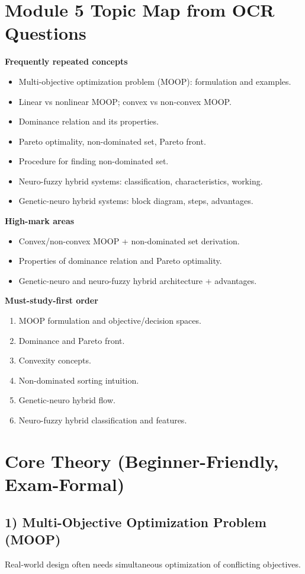 \documentclass[11pt,a4paper]{article}
\begin{document}
\section*{Module 5 Topic Map from OCR Questions}
\textbf{Frequently repeated concepts}
\begin{itemize}
\item Multi-objective optimization problem (MOOP): formulation and examples.
\item Linear vs nonlinear MOOP; convex vs non-convex MOOP.
\item Dominance relation and its properties.
\item Pareto optimality, non-dominated set, Pareto front.
\item Procedure for finding non-dominated set.
\item Neuro-fuzzy hybrid systems: classification, characteristics, working.
\item Genetic-neuro hybrid systems: block diagram, steps, advantages.
\end{itemize}

\textbf{High-mark areas}
\begin{itemize}
\item Convex/non-convex MOOP + non-dominated set derivation.
\item Properties of dominance relation and Pareto optimality.
\item Genetic-neuro and neuro-fuzzy hybrid architecture + advantages.
\end{itemize}

\textbf{Must-study-first order}
\begin{enumerate}
\item MOOP formulation and objective/decision spaces.
\item Dominance and Pareto front.
\item Convexity concepts.
\item Non-dominated sorting intuition.
\item Genetic-neuro hybrid flow.
\item Neuro-fuzzy hybrid classification and features.
\end{enumerate}

\section*{Core Theory (Beginner-Friendly, Exam-Formal)}

\subsection*{1) Multi-Objective Optimization Problem (MOOP)}
Real-world design often needs simultaneous optimization of conflicting objectives.
\end{document}
